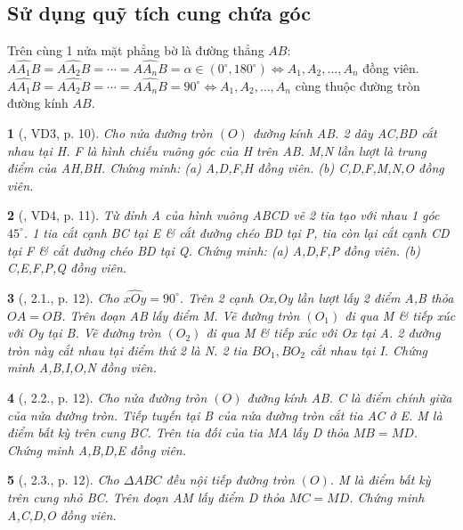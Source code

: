 \documentclass{article}
\newtheorem{baitoan}{}
\begin{document}
\subsection{Sử dụng quỹ tích cung chứa góc}
 Trên cùng 1 nửa mặt phẳng bờ là đường thẳng $AB$: $\widehat{AA_1B} = \widehat{AA_2B} = \cdots = \widehat{AA_nB} = \alpha\in(0^\circ,180^\circ)\Leftrightarrow A_1,A_2,\ldots,A_n$ đồng viên.  $\widehat{AA_1B} = \widehat{AA_2B} = \cdots = \widehat{AA_nB} = 90^\circ\Leftrightarrow A_1,A_2,\ldots,A_n$ cùng thuộc đường tròn đường kính $AB$.

\begin{baitoan}[\cite{Thu_Chung_Viet_Minh_circ}, VD3, p. 10]
	Cho nửa đường tròn $(O)$ đường kính AB. 2 dây AC,BD cắt nhau tại H. F là hình chiếu vuông góc của H trên AB. M,N lần lượt là trung điểm của AH,BH. Chứng minh: (a) A,D,F,H đồng viên. (b) C,D,F,M,N,O đồng viên.
\end{baitoan}

\begin{baitoan}[\cite{Thu_Chung_Viet_Minh_circ}, VD4, p. 11]
	Từ đỉnh A của hình vuông ABCD vẽ 2 tia tạo với nhau 1 góc $45^\circ$. 1 tia cắt cạnh BC tại E \& cắt đường chéo BD tại P, tia còn lại cắt cạnh CD tại F \& cắt đường chéo BD tại Q. Chứng minh: (a) A,D,F,P đồng viên. (b) C,E,F,P,Q đồng viên.
\end{baitoan}

\begin{baitoan}[\cite{Thu_Chung_Viet_Minh_circ}, 2.1., p. 12]
	Cho $\widehat{xOy} = 90^\circ$. Trên 2 cạnh Ox,Oy lần lượt lấy 2 điểm A,B thỏa $OA = OB$. Trên đoạn AB lấy điểm M. Vẽ đường tròn $(O_1)$ đi qua M \& tiếp xúc với Oy tại B. Vẽ đường tròn $(O_2)$ đi qua M \& tiếp xúc với Ox tại A. 2 đường tròn này cắt nhau tại điểm thứ 2 là N. 2 tia $BO_1,BO_2$ cắt nhau tại I. Chứng minh A,B,I,O,N đồng viên.
\end{baitoan}

\begin{baitoan}[\cite{Thu_Chung_Viet_Minh_circ}, 2.2., p. 12]
	Cho nửa đường tròn $(O)$ đường kính AB. C là điểm chính giữa của nửa đường tròn. Tiếp tuyến tại B của nửa đường tròn cắt tia AC ở E. M là điểm bất kỳ trên cung BC. Trên tia đối của tia MA lấy D thỏa $MB = MD$. Chứng minh A,B,D,E đồng viên.
\end{baitoan}

\begin{baitoan}[\cite{Thu_Chung_Viet_Minh_circ}, 2.3., p. 12]
	Cho $\Delta ABC$ đều nội tiếp đường tròn $(O)$. M là điểm bất kỳ trên cung nhỏ BC. Trên đoạn AM lấy điểm D thỏa $MC = MD$. Chứng minh A,C,D,O đồng viên.
\end{baitoan}
\end{document}
